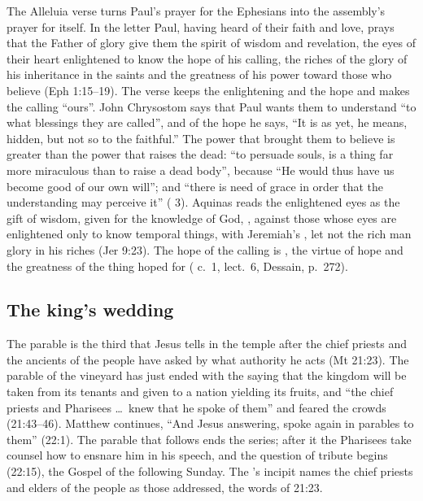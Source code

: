 The Alleluia verse turns Paul's prayer for the Ephesians into the assembly's
prayer for itself. In the letter Paul, having heard of their faith and love,
prays that the Father of glory give them the spirit of wisdom and revelation,
the eyes of their heart enlightened to know the hope of his calling, the riches
of the glory of his inheritance in the saints and the greatness of his power
toward those who believe (Eph 1:15--19). The verse keeps the enlightening and
the hope and makes the calling ``ours''. John Chrysostom says that Paul wants
them to understand ``to what blessings they are called'', and of the hope he
says, ``It is as yet, he means, hidden, but not so to the faithful.'' The power
that brought them to believe is greater than the power that raises the dead:
``to persuade souls, is a thing far more miraculous than to raise a dead
body'', because ``He would thus have us become good of our own will''; and
``there is need of grace in order that the understanding may perceive it''
( 3). Aquinas reads the enlightened eyes as the gift
of wisdom, given for the knowledge of God, , against those whose eyes are
enlightened only to know temporal things, with Jeremiah's , let not the rich man glory in his riches (Jer 9:23).
The hope of the calling is , the virtue
of hope and the greatness of the thing hoped for ( c.~1,
lect.~6, Dessain, p.~272).

\subsection{The king's wedding}

The parable is the third that Jesus tells in the temple after the chief
priests and the ancients of the people have asked by what authority he acts
(Mt 21:23). The parable of the vineyard has just ended with the saying that the
kingdom will be taken from its tenants and given to a nation yielding its
fruits, and ``the chief priests and Pharisees \ldots\ knew that he spoke of
them'' and feared the crowds (21:43--46). Matthew continues, ``And Jesus
answering, spoke again in parables to them'' (22:1). The parable that follows
ends the series; after it the Pharisees take counsel how to ensnare him in his
speech, and the question of tribute begins (22:15), the Gospel of the following
Sunday. The 's incipit names the chief priests and elders of the
people as those addressed, the words of 21:23.

